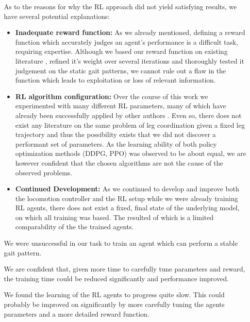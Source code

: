 As to the reasons for why the RL approach did not yield satisfying results, we have several potential explanations:
\begin{itemize}
	\item \textbf{Inadequate reward function: } As we already mentioned, defining a reward function which accurately judges an agent's performance is a difficult task, requiring expertise.
	Although we based our reward function on existing literature \parencite{trotta2022walking, schilling2021decentralized}, refined it's weight over several iterations and thoroughly tested it judgement on the static gait patterns, we cannot rule out a flaw in the function which leads to exploitation or loss of relevant information.
	
	\item \textbf{RL algorithm configuration: } Over the course of this work we experimented with many different RL parameters, many of which have already been successfully applied by other authors \parencite{matlabDDPGExample, matlabPPOExample, trotta2022walking}.
	Even so, there does not exist any literature on the same problem of leg coordination given a fixed leg trajectory and thus the possibility exists that we did not discover a performant set of parameters.
	As the learning ability of both policy optimization methods (DDPG, PPO) was observed to be about equal, we are however confident that the chosen algorithms are not the cause of the observed problems.
	
	\item \textbf{Continued Development: } As we continued to develop and improve both the locomotion controller and the RL setup while we were already training RL agents, there does not exist a fixed, final state of the underlying model, on which all training was based.
	The resulted of which is a limited comparability of the the trained agents.
	
\end{itemize}



We were unsuccessful in our task to train an agent which can perform a stable gait pattern.

We are confident that, given more time to carefully tune parameters and reward, the training time could be reduced significantly and performance improved.

We found the learning of the RL agents to progress quite slow. 
This could probably be improved on significantly by more carefully tuning the agents parameters and a more detailed reward function.




